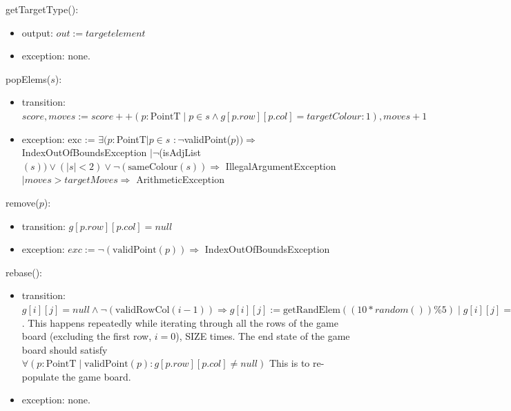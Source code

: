\documentclass[12pt]{article}
\begin{document}
\noindent getTargetType():

\begin{itemize}

\item output: $out := targetelement$

\item exception: none.

\end{itemize}

\noindent popElems($s$):

\begin{itemize}

\item transition: $score, moves := score + +(p:\mbox{PointT}\mid p \in s \land g[p.row][p.col] = targetColour:1), moves+1$
\item exception: exc := $\exists (p : $PointT$\mid p \in s$ $: \lnot$validPoint($p$)$) \Rightarrow$ IndexOutOfBoundsException $\mid \lnot$(isAdjList$(s)) \lor (|s| < 2) \lor \lnot(\mbox{sameColour}(s))\Rightarrow$ IllegalArgumentException $\mid moves > targetMoves \Rightarrow$ ArithmeticException

\end{itemize}

\noindent remove($p$):

\begin{itemize}

\item transition: $g[p.row][p.col]= null$

\item exception: $exc:=\lnot (\mbox{validPoint}(p)) \Rightarrow$ IndexOutOfBoundsException

\end{itemize}

\noindent rebase():

\begin{itemize}

\item transition: $g[i][j] = null \land \lnot(\mbox{validRowCol}(i-1)) \Rightarrow g[i][j] := \mbox{getRandElem}((10*random())\%5) \mid g[i][j] = null \land g[i-1][j] \ne null \Rightarrow g[i][j], g[i-1][j] := g[i][j-1], null$. This happens repeatedly while iterating through all the rows of the game board (excluding the first row, $i=0$), SIZE times. The end state of the game board should satisfy $\forall (p: \mbox{PointT}\mid \mbox{validPoint}(p):g[p.row][p.col] \ne null)$ This is to re-populate the game board.

\item exception: none.

\end{itemize}
\end{document}
